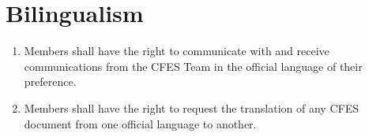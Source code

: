 \section{Bilingualism}
\label{bilingualism}

\begin{enumerate}
 \item Members shall have the right to communicate with and receive communications from the CFES Team in the official language of their preference.
 \item Members shall have the right to request the translation of any CFES document from one official language to another.
\end{enumerate}
